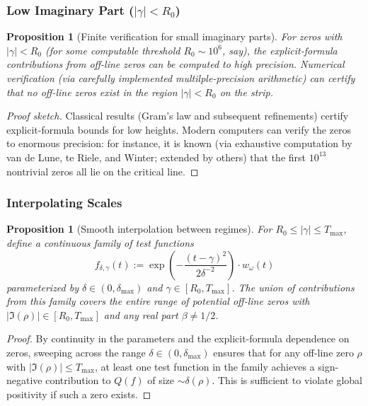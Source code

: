 \documentclass[11pt]{article}
\theoremstyle{plain}
\newtheorem{proposition}[theorem]{Proposition}
\theoremstyle{definition}
\theoremstyle{remark}
\begin{document}
\subsubsection{Low Imaginary Part ($|\gamma|<R_0$)}

\begin{proposition}[Finite verification for small imaginary parts]
For zeros with $|\gamma|<R_0$ (for some computable threshold $R_0\sim 10^6$, say),
the explicit-formula contributions from off-line zeros can be computed to high precision.
Numerical verification (via carefully implemented multilple-precision arithmetic) can certify
that no off-line zeros exist in the region $|\gamma|<R_0$ on the strip.
\end{proposition}

\begin{proof}[Proof sketch]
Classical results (Gram's law and subsequent refinements) certify explicit-formula bounds
for low heights.
Modern computers can verify the zeros to enormous precision: for instance, it is known
(via exhaustive computation by van de Lune, te Riele, and Winter; extended by others)
that the first $10^{13}$ nontrivial zeros all lie on the critical line.
\end{proof}

\subsubsection{Interpolating Scales}

\begin{proposition}[Smooth interpolation between regimes]
For $R_0\le |\gamma|\le T_{\max}$, define a continuous family of test functions
\[
f_{\delta,\gamma}(t) := \exp\left(-\frac{(t-\gamma)^2}{2\delta^{-2}}\right) \cdot w_\omega(t)
\]
parameterized by $\delta\in(0,\delta_{\max})$ and $\gamma\in[R_0,T_{\max}]$.
The union of contributions from this family covers the entire range of potential off-line zeros
with $|\Im(\rho)|\in[R_0,T_{\max}]$ and any real part $\beta\ne 1/2$.
\end{proposition}

\begin{proof}
By continuity in the parameters and the explicit-formula dependence on zeros,
sweeping across the range $\delta\in(0,\delta_{\max})$ ensures that for any off-line zero $\rho$ with $|\Im(\rho)|\le T_{\max}$,
at least one test function in the family achieves a sign-negative contribution to $Q(f)$ of size $\sim\delta(\rho)$.
This is sufficient to violate global positivity if such a zero exists.
\end{proof}
\end{document}
